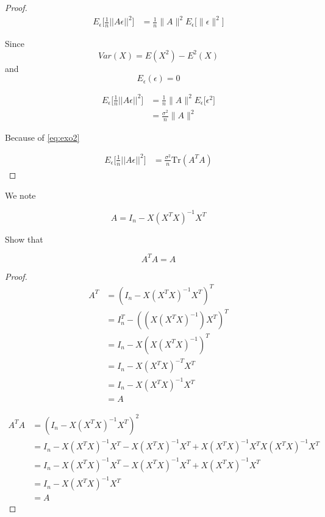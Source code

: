 \begin{proof}
    \begin{align*}
        E_\epsilon \Big[ \frac{1}{n} ||A\epsilon ||^2 \Big] &= 
            \frac{1}{n} \| A \|^2 E_\epsilon \Big[  \| \epsilon \|^2 \Big]
    \end{align*}

    Since
    \begin{equation}
        Var(X) = E(X^2) - E^2(X) 
    \end{equation}
    and
    \begin{equation}
        E_\epsilon (\epsilon) = 0
    \end{equation}

    \begin{align*}
        E_\epsilon \Big[ \frac{1}{n} ||A\epsilon ||^2 \Big] &=            \frac{1}{n} \| A \|^2 E_\epsilon \Big[ \epsilon ^2 \Big]\\
            &= \frac{\sigma^2}{n} \| A \|^2
    \end{align*}
    
    Because of \eqref{eq:exo2}
    
    \begin{align*}
        E_\epsilon \Big[ \frac{1}{n} ||A\epsilon ||^2 \Big] &=  \frac{\sigma^2}{n} \mathrm {Tr} (A^T A)
    \end{align*}
\end{proof}


We note

\begin{equation} \label{eq:exo4}
    A = I_n - X (X^T X)^{-1} X^T
\end{equation}

Show that

\begin{equation}
    A^T A = A
\end{equation}

\begin{proof}
    \begin{align*}
        A^T &= (I_n - X (X^T X)^{-1} X^T)^T\\
            &= I_n^T - ((X (X^T X)^{-1}) X^T)^T\\
            &= I_n - X (X (X^T X)^{-1})^T\\
            &= I_n - X (X^T X)^{-T} X^T\\
            &= I_n - X (X^T X)^{-1} X^T\\
            &= A
    \end{align*}
    
    \begin{align*}
        A^T A &= (I_n - X (X^T X)^{-1} X^T)^2\\
            &= I_n - X (X^T X)^{-1} X^T - X (X^T X)^{-1} X^T + X (X^T X)^{-1} X^TX (X^T X)^{-1} X^T\\
            &=  I_n - X (X^T X)^{-1} X^T - X (X^T X)^{-1} X^T + X (X^T X)^{-1} X^T\\
            &=  I_n - X (X^T X)^{-1} X^T\\
            &= A
    \end{align*}
\end{proof}

